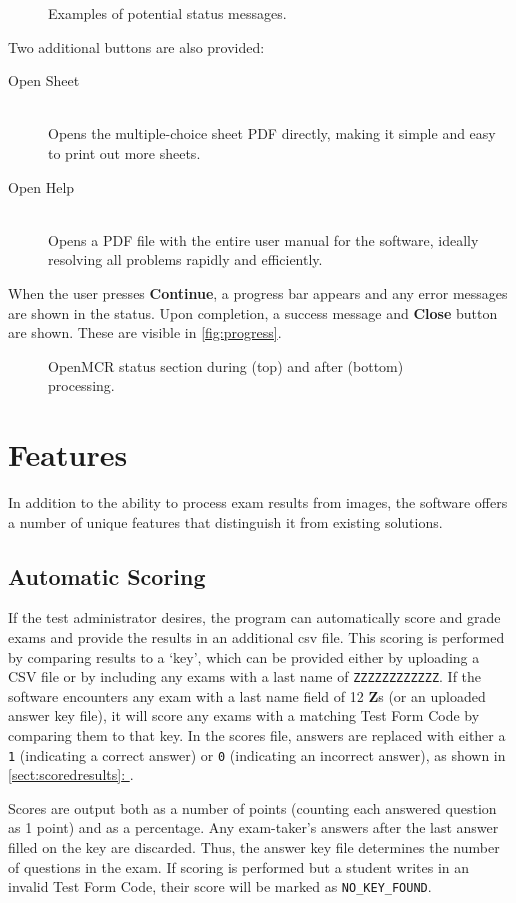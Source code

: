 \documentclass[12pt, letterpaper]{report}
\newcommand*{\sectref}[1]{\hyperref[{#1}]{\ref*{#1}: \nameref*{#1}}}
\newcommand*{\itemref}[1]{\hyperref[{#1}]{\autoref*{#1}}}
\newcommand*{\boxedimage}[1]{\fbox{\texttt{[image: img/\#1]}}}
\newcommand{\fig}[3]{
  \begin{figure}[!htbp]
    \caption{#1}
    \label{#3}
    \centering
    \boxedimage{#2}
  \end{figure}
}
\newcommand*{\descitem}[1]{\item[#1] \hfill \\ }
\begin{document}
\fig{Examples of potential status messages.}{statuses.png}{fig:statuses}

Two additional buttons are also provided:
\begin{description}
  \descitem{Open Sheet} Opens the multiple-choice sheet PDF directly, making it
  simple and easy to print out more sheets.
  \descitem{Open Help} Opens a PDF file with the entire user manual for the
  software, ideally resolving all problems rapidly and efficiently.
\end{description}

When the user presses \textbf{Continue}, a progress bar appears and any error
messages are shown in the status. Upon completion, a success message and \textbf{Close}
button are shown. These are visible in \itemref{fig:progress}.

\fig{OpenMCR status section during (top) and after (bottom) processing.}{progress.png}{fig:progress}

\section{Features}
In addition to the ability to process exam results from images, the software
offers a number of unique features that distinguish it from existing solutions.

\subsection{Automatic Scoring}
\label{sect:scoring}
If the test administrator desires, the program can automatically score and grade
exams and provide the results in an additional \ac{csv} file. This scoring is
performed by comparing results to a `key', which can be provided either by
uploading a CSV file or by including any exams with a last name of
\verb!ZZZZZZZZZZZZ!. If the software encounters any exam with a last name field
of 12 \textbf{Z}s (or an uploaded answer key file), it will score any exams with
a matching Test Form Code by comparing them to that key. In the scores file,
answers are replaced with either a \verb!1! (indicating a correct answer) or
\verb!0! (indicating an incorrect answer), as shown in \sectref{sect:scoredresults}.

Scores are output both as a number of points (counting each answered question
as 1 point) and as a percentage. Any exam-taker's answers after the last answer
filled on the key are discarded. Thus, the answer key file determines the number
of questions in the exam. If scoring is performed but a student writes in an
invalid Test Form Code, their score will be marked as \verb!NO_KEY_FOUND!.
\end{document}
